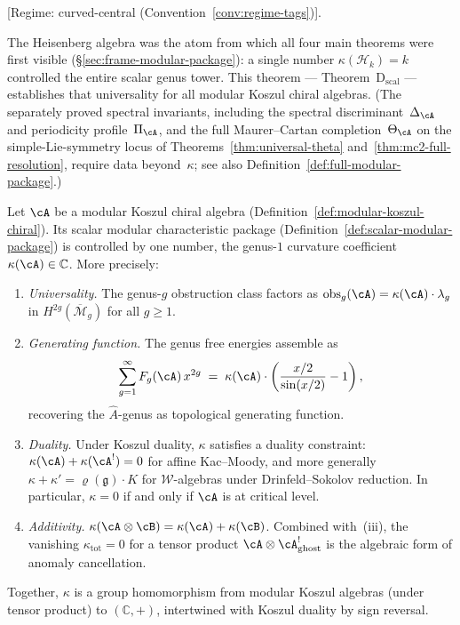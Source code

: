 \begin{theorem}
\label{thm:modular-characteristic}
\textup{[}Regime: curved-central
\textup{(}Convention~\textup{\ref{conv:regime-tags})].}

\smallskip\noindent
The Heisenberg algebra was the atom from which all four main theorems were first visible (\S\ref{sec:frame-modular-package}): a single number $\kappa(\mathcal{H}_k) = k$ controlled the entire scalar genus tower.  This theorem --- Theorem~D$_{\mathrm{scal}}$ --- establishes that universality for all modular Koszul chiral algebras.  (The separately proved spectral invariants, including the spectral discriminant~$\Delta_{\cA}$ and periodicity profile~$\Pi_{\cA}$, and the full Maurer--Cartan completion~$\Theta_{\cA}$ on the simple-Lie-symmetry locus of Theorems~\ref{thm:universal-theta} and~\ref{thm:mc2-full-resolution}, require data beyond~$\kappa$; see also Definition~\ref{def:full-modular-package}.)

Let $\cA$ be a modular Koszul chiral algebra
(Definition~\ref{def:modular-koszul-chiral}).  Its scalar modular
characteristic package
(Definition~\ref{def:scalar-modular-package}) is controlled by one
number, the genus-$1$ curvature coefficient
$\kappa(\cA) \in \mathbb{C}$.  More precisely:

\begin{enumerate}[label=\textup{(\roman*)}]
\item \emph{Universality.}
  The genus-$g$ obstruction class factors as
  $\mathrm{obs}_g(\cA) = \kappa(\cA) \cdot \lambda_g$
  in $H^{2g}(\overline{\mathcal{M}}_g)$ for all $g \geq 1$.
\item \emph{Generating function.}
  The genus free energies assemble as
  \begin{equation}\label{eq:modular-char-gf}
  \sum_{g=1}^{\infty} F_g(\cA)\, x^{2g}
  \;=\; \kappa(\cA) \cdot
  \left(\frac{x/2}{\sin(x/2)} - 1\right),
  \end{equation}
  recovering the $\hat{A}$-genus as topological generating function.
\item \emph{Duality.}
  Under Koszul duality, $\kappa$ satisfies a duality constraint:
  $\kappa(\cA) + \kappa(\cA^!) = 0$ for affine Kac--Moody,
  and more generally $\kappa + \kappa' = \varrho(\mathfrak{g}) \cdot K$
  for $\mathcal{W}$-algebras under Drinfeld--Sokolov reduction.
  In particular, $\kappa = 0$ if and only if $\cA$ is at critical level.
\item \emph{Additivity.}
  $\kappa(\cA \otimes \cB) = \kappa(\cA) + \kappa(\cB)$.
  Combined with~(iii), the vanishing
  $\kappa_{\mathrm{tot}} = 0$ for a tensor product
  $\cA \otimes \cA^!_{\mathrm{ghost}}$ is the algebraic
  form of anomaly cancellation.
\end{enumerate}
Together, $\kappa$ is a group homomorphism from modular Koszul
algebras (under tensor product) to $(\mathbb{C}, +)$,
intertwined with Koszul duality by sign reversal.
\end{theorem}

